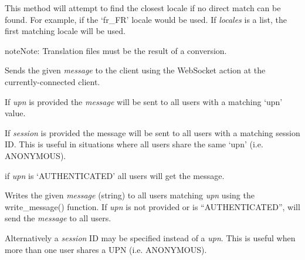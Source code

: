 \documentclass[letterpaper,10pt,openany]{sphinxmanual}
\begin{document}
\begin{fulllineitems}
\begin{fulllineitems}
This method will attempt to find the closest locale if no direct match
can be found.  For example, if  the `fr\_FR' locale
would be used.  If \emph{locales} is a list, the first matching locale will
be used.

\begin{notice}{note}{Note:}
Translation files must be the result of a
 conversion.
\end{notice}

\end{fulllineitems}


\begin{fulllineitems}
\label{Developer/server:gateone.core.server.ApplicationWebSocket.send_message}
Sends the given \emph{message} to the client using the 
WebSocket action at the currently-connected client.

If \emph{upn} is provided the \emph{message} will be sent to all users with a
matching `upn' value.

If \emph{session} is provided the message will be sent to all users with a
matching session ID.  This is useful in situations where all users share
the same `upn' (i.e. ANONYMOUS).

if \emph{upn} is `AUTHENTICATED' all users will get the message.

\end{fulllineitems}


\begin{fulllineitems}
\label{Developer/server:gateone.core.server.ApplicationWebSocket._deliver}
Writes the given \emph{message} (string) to all users matching \emph{upn} using
the write\_message() function.  If \emph{upn} is not provided or is
``AUTHENTICATED'', will send the \emph{message} to all users.

Alternatively a \emph{session} ID may be specified instead of a \emph{upn}.  This
is useful when more than one user shares a UPN (i.e. ANONYMOUS).

\end{fulllineitems}


\end{fulllineitems}
\end{document}
